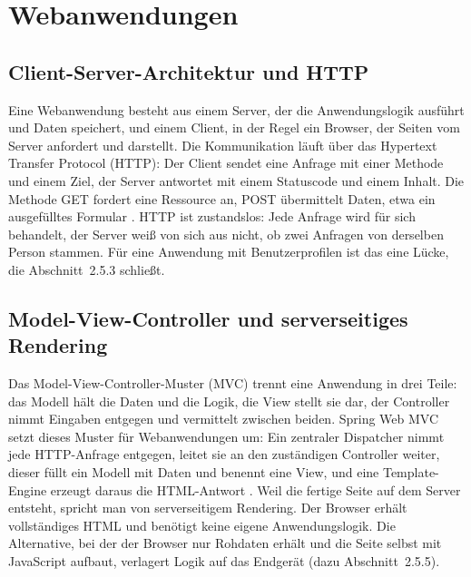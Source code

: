 \documentclass[12pt,a4paper]{scrreprt}
\begin{document}
\section{Webanwendungen}

\subsection{Client-Server-Architektur und HTTP}
Eine Webanwendung besteht aus einem Server, der die Anwendungslogik ausführt und Daten speichert, und einem Client, in der Regel ein Browser, der Seiten vom Server anfordert und darstellt. Die Kommunikation läuft über das Hypertext Transfer Protocol (HTTP): Der Client sendet eine Anfrage mit einer Methode und einem Ziel, der Server antwortet mit einem Statuscode und einem Inhalt. Die Methode GET fordert eine Ressource an, POST übermittelt Daten, etwa ein ausgefülltes Formular \cite{rfc9110}. HTTP ist zustandslos: Jede Anfrage wird für sich behandelt, der Server weiß von sich aus nicht, ob zwei Anfragen von derselben Person stammen. Für eine Anwendung mit Benutzerprofilen ist das eine Lücke, die Abschnitt~2.5.3 schließt.

\subsection{Model-View-Controller und serverseitiges Rendering}
Das Model-View-Controller-Muster (MVC) trennt eine Anwendung in drei Teile: das Modell hält die Daten und die Logik, die View stellt sie dar, der Controller nimmt Eingaben entgegen und vermittelt zwischen beiden. Spring Web MVC setzt dieses Muster für Webanwendungen um: Ein zentraler Dispatcher nimmt jede HTTP-Anfrage entgegen, leitet sie an den zuständigen Controller weiter, dieser füllt ein Modell mit Daten und benennt eine View, und eine Template-Engine erzeugt daraus die HTML-Antwort \cite{springmvc}. Weil die fertige Seite auf dem Server entsteht, spricht man von serverseitigem Rendering. Der Browser erhält vollständiges HTML und benötigt keine eigene Anwendungslogik. Die Alternative, bei der der Browser nur Rohdaten erhält und die Seite selbst mit JavaScript aufbaut, verlagert Logik auf das Endgerät (dazu Abschnitt~2.5.5).
\end{document}
